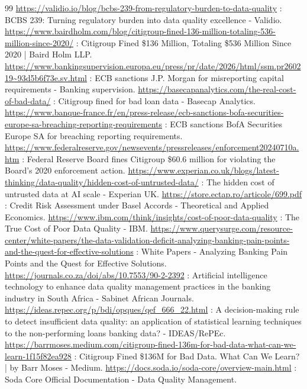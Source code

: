 \begin{thebibliography}{99}
     \url{https://validio.io/blog/bcbs-239-from-regulatory-burden-to-data-quality} : BCBS 239: Turning regulatory burden into data quality excellence - Validio.
     \url{https://www.bairdholm.com/blog/citigroup-fined-136-million-totaling-536-million-since-2020/} : Citigroup Fined \$136 Million, Totaling \$536 Million Since 2020 | Baird Holm LLP.
     \url{https://www.bankingsupervision.europa.eu/press/pr/date/2026/html/ssm.pr260219~93d5b6f73e.sv.html} : ECB sanctions J.P. Morgan for misreporting capital requirements - Banking supervision.
     \url{https://basecapanalytics.com/the-real-cost-of-bad-data/} : Citigroup fined for bad loan data - Basecap Analytics.
     \url{https://www.banque-france.fr/en/press-release/ecb-sanctions-bofa-securities-europe-sa-breaching-reporting-requirements} : ECB sanctions BofA Securities Europe SA for breaching reporting requirements.
     \url{https://www.federalreserve.gov/newsevents/pressreleases/enforcement20240710a.htm} : Federal Reserve Board fines Citigroup \$60.6 million for violating the Board's 2020 enforcement action.
     \url{https://www.experian.co.uk/blogs/latest-thinking/data-quality/hidden-cost-of-untrusted-data/} : The hidden cost of untrusted data at AI scale - Experian UK.
     \url{https://store.ectap.ro/articole/699.pdf} : Credit Risk Assessment under Basel Accords - Theoretical and Applied Economics.
     \url{https://www.ibm.com/think/insights/cost-of-poor-data-quality} : The True Cost of Poor Data Quality - IBM.
     \url{https://www.querysurge.com/resource-center/white-papers/the-data-validation-deficit-analyzing-banking-pain-points-and-the-quest-for-effective-solutions} : White Papers - Analyzing Banking Pain Points and the Quest for Effective Solutions.
     \url{https://journals.co.za/doi/abs/10.7553/90-2-2392} : Artificial intelligence technology to enhance data quality management practices in the banking industry in South Africa - Sabinet African Journals.
     \url{https://ideas.repec.org/p/bdi/opques/qef_666_22.html} : A decision-making rule to detect insufficient data quality: an application of statistical learning techniques to the non-performing loans banking data? - IDEAS/RePEc.
     \url{https://barrmoses.medium.com/citigroup-fined-136m-for-bad-data-what-can-we-learn-1f15f82ea928} : Citigroup Fined \$136M for Bad Data. What Can We Learn? | by Barr Moses - Medium.
     \url{https://docs.soda.io/soda-core/overview-main.html} : Soda Core Official Documentation - Data Quality Management.

\end{thebibliography}
